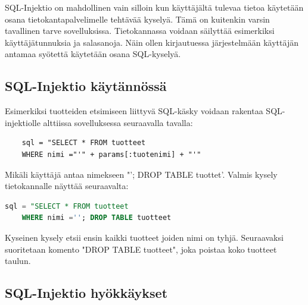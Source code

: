 \documentclass[finnish]{tktltiki2}
\theoremstyle{definition}
\theoremstyle{remark}
\begin{document}
	SQL-Injektio on mahdollinen vain silloin kun käyttäjältä tulevaa tietoa käytetään osana tietokantapalvelimelle tehtävää kyselyä. Tämä on kuitenkin varsin tavallinen tarve sovelluksissa. Tietokannassa voidaan säilyttää esimerkiksi käyttäjätunnuksia ja salasanoja. Näin ollen kirjautuessa järjestelmään käyttäjän antamaa syötettä käytetään osana SQL-kyselyä.
	
	\subsection{SQL-Injektio käytännössä}
	
 Esimerkiksi tuotteiden etsimiseen liittyvä SQL-käsky voidaan rakentaa SQL-injektiolle alttiissa sovelluksessa seuraavalla tavalla:
 
	\begin{lstlisting}
	sql = "SELECT * FROM tuotteet
	WHERE nimi ="'" + params[:tuotenimi] + "'"
	\end{lstlisting}
	
	Mikäli käyttäjä antaa nimekseen "\space'; DROP TABLE tuottet'. Valmis kysely tietokannalle näyttää seuraavalta:
	
	\begin{lstlisting}[language=sql]
	sql = "SELECT * FROM tuotteet
	WHERE nimi =''; DROP TABLE tuotteet     
	\end{lstlisting}
	
	Kyseinen kysely etsii ensin kaikki tuotteet joiden nimi on tyhjä. Seuraavaksi suoritetaan komento "DROP TABLE tuotteet", joka poistaa koko tuotteet taulun.
	
	\subsection{SQL-Injektio hyökkäykset}
	
\end{document}
